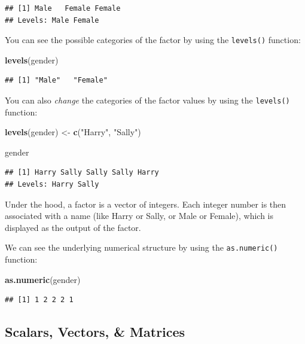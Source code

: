 \documentclass[
]{book}
\newenvironment{Shaded}{\begin{snugshade}}{\end{snugshade}}
\newcommand{\FunctionTok}[1]{\textcolor[rgb]{0.13,0.29,0.53}{\textbf{#1}}}
\newcommand{\NormalTok}[1]{#1}
\newcommand{\OtherTok}[1]{\textcolor[rgb]{0.56,0.35,0.01}{#1}}
\newcommand{\StringTok}[1]{\textcolor[rgb]{0.31,0.60,0.02}{#1}}
\begin{document}
\begin{verbatim}
## [1] Male   Female Female
## Levels: Male Female
\end{verbatim}

You can see the possible categories of the factor by using the \texttt{levels()} function:

\begin{Shaded}
\begin{Highlighting}[]
\FunctionTok{levels}\NormalTok{(gender)}
\end{Highlighting}
\end{Shaded}

\begin{verbatim}
## [1] "Male"   "Female"
\end{verbatim}

You can also \emph{change} the categories of the factor values by using the \texttt{levels()} function:

\begin{Shaded}
\begin{Highlighting}[]
\FunctionTok{levels}\NormalTok{(gender) }\OtherTok{\textless{}{-}} \FunctionTok{c}\NormalTok{(}\StringTok{"Harry"}\NormalTok{, }\StringTok{"Sally"}\NormalTok{)}

\NormalTok{gender}
\end{Highlighting}
\end{Shaded}

\begin{verbatim}
## [1] Harry Sally Sally Sally Harry
## Levels: Harry Sally
\end{verbatim}

Under the hood, a factor is a vector of integers. Each integer number is then associated with a name (like Harry or Sally, or Male or Female), which is displayed as the output of the factor.

We can see the underlying numerical structure by using the \texttt{as.numeric()} function:

\begin{Shaded}
\begin{Highlighting}[]
\FunctionTok{as.numeric}\NormalTok{(gender)}
\end{Highlighting}
\end{Shaded}

\begin{verbatim}
## [1] 1 2 2 2 1
\end{verbatim}

\subsection{Scalars, Vectors, \& Matrices}\label{scalars-vectors-matrices}
\end{document}
